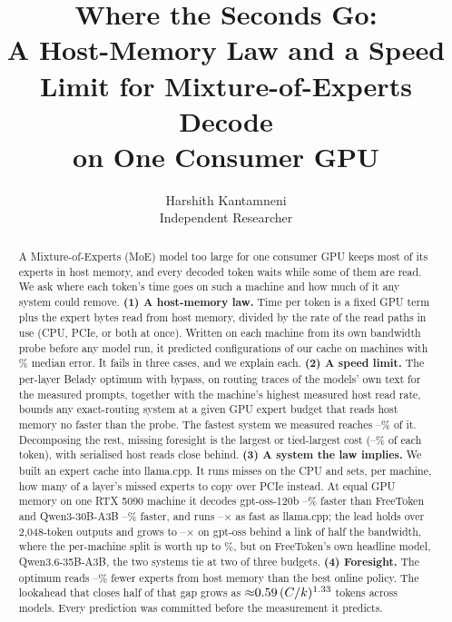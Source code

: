 \documentclass[10pt,twocolumn]{article}
\title{Where the Seconds Go:\\[2pt]\large A Host-Memory Law and a Speed Limit for Mixture-of-Experts Decode\\ on One Consumer GPU}
\author{Harshith Kantamneni\\Independent Researcher}
\date{}
\begin{document}
\maketitle

\begin{abstract}
A Mixture-of-Experts (MoE) model too large for one consumer GPU keeps most of its experts in host memory, and every
decoded token waits while some of them are read. We ask where each token's time goes on such a machine and how much of it
any system could remove.
\textbf{(1) A host-memory law.} Time per token is a fixed GPU term plus the expert bytes read from host memory, divided
by the rate of the read paths in use (CPU, PCIe, or both at once). Written on each machine from its own bandwidth probe
before any model run, it predicted \lawCfg{} configurations of our cache on \lawHosts{} machines with \lawMedian\%
median error. It fails in three cases, and we explain each.
\textbf{(2) A speed limit.} The per-layer Belady optimum with bypass, on routing traces of the models' own text for the
measured prompts, together
with the machine's highest measured host read rate, bounds any exact-routing system at a given GPU expert budget that reads host memory no faster than the probe. The
fastest system we measured reaches \limitPctMin--\limitPctMax\% of it. Decomposing the rest, missing foresight is the
largest or tied-largest cost (\gapFsMin--\gapFsMax\% of each token), with serialised host reads close behind.
\textbf{(3) A system the law implies.} We built an expert cache into llama.cpp. It runs misses on the CPU and sets,
per machine, how many of a layer's missed experts to copy over PCIe instead. At equal GPU memory on one RTX 5090 machine
it decodes gpt-oss-120b \ftLeadGptMin--\ftLeadGptMax\% faster than FreeToken and Qwen3-30B-A3B
\ftLeadQwenMin--\ftLeadQwenMax\% faster, and runs \llamaXMin--\llamaXMax$\times$ as fast as llama.cpp; the lead holds over 2{,}048-token outputs and grows to
\hpGptFtMin--\hpGptFtMax$\times$ on gpt-oss behind a link of half the bandwidth, where the per-machine split is worth up to
\hpGptLawMax\%, but on FreeToken's own headline model, Qwen3.6-35B-A3B, the two systems tie at two of three budgets.
\textbf{(4) Foresight.} The optimum reads \fsSaveMin--\fsSaveMax\% fewer experts from host memory than the best online
policy. The lookahead that closes half of that gap grows as ${\approx}0.59\,(C/k)^{1.33}$ tokens across \fsModels{} models.
Every prediction was committed before the measurement it predicts.
\end{abstract}
\end{document}
